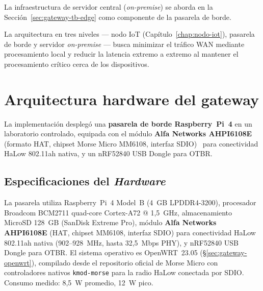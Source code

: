 La infraestructura de servidor central (\emph{on-premise}) se aborda en la Sección~\ref{sec:gateway-tb-edge} como componente de la pasarela de borde.


La arquitectura en tres niveles --- nodo IoT (Cap\'{i}tulo~\ref{chap:nodo-iot}), pasarela de borde y servidor \emph{on-premise} --- busca minimizar el tr\'{a}fico WAN mediante procesamiento local y reducir la latencia extremo a extremo al mantener el procesamiento cr\'{i}tico cerca de los dispositivos.

\section{Arquitectura hardware del gateway}
\label{sec:gateway-arquitectura}

La implementaci\'{o}n despleg\'{o} una \textbf{pasarela de borde Raspberry~Pi~4} en un laboratorio controlado, equipada con el m\'{o}dulo \textbf{Alfa Networks AHPI6108E} (formato HAT, chipset Morse Micro MM6108, interfaz SDIO)~\cite{morsemicroMM8108ProductBrief2025} para conectividad HaLow 802.11ah nativa, y un nRF52840 USB Dongle para OTBR.

\subsection{Especificaciones del \emph{Hardware}}
\label{sec:gateway-hardware}

La pasarela utiliza Raspberry~Pi~4 Model~B (4~GB LPDDR4-3200), procesador Broadcom BCM2711 quad-core Cortex-A72 @ 1,5~GHz, almacenamiento MicroSD 128~GB (SanDisk Extreme Pro), módulo \textbf{Alfa Networks AHPI6108E} (HAT, chipset MM6108, interfaz SDIO) para conectividad HaLow 802.11ah nativa (902--928~MHz, hasta 32,5~Mbps PHY), y nRF52840 USB Dongle para OTBR.  El sistema operativo es OpenWRT~23.05 (§\ref{sec:gateway-openwrt}), compilado desde el repositorio oficial de Morse Micro con controladores nativos \texttt{kmod-morse} para la radio HaLow conectada por SDIO.  Consumo medido: 8,5~W promedio, 12~W pico.

